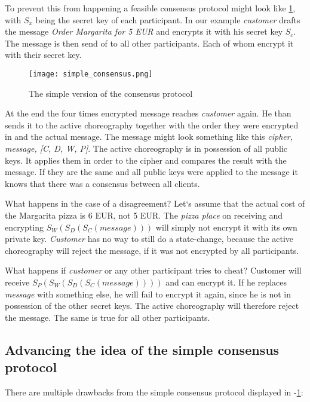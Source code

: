 \documentclass[runningheads]{llncs}
\begin{document}
To prevent this from happening a feasible consensus protocol might look like \ref{fig:simple}, with $S_x$ being the secret key of each participant. In our example \textit{customer} drafts the message \textit{Order Margarita for 5 EUR} and encrypts it with his secret key $S_c$. The message is then send of to all other participants. Each of whom encrypt it with their secret key. 


\begin{figure}
    \centering
    \texttt{[image: simple\_consensus.png]}
    \caption{The simple version of the consensus protocol}
    \label{fig:simple}
\end{figure}


At the end the four times encrypted message reaches \textit{customer} again. He than sends it to the active choreography together with the order they were encrypted in and the actual message. The message might look something like this \textit{cipher, message, [C, D, W, P]}. The active choreography is in possession of all public keys. It applies them in order to the cipher and compares the result with the message. If they are the same and all public keys were applied to the message it knows that there was a consensus between all clients. 

What happens in the case of a disagreement? Let`s assume that the actual cost of the Margarita pizza is 6 EUR, not 5 EUR. The \textit{pizza place} on receiving and encrypting  $S_W(S_D(S_C(message)))$ will simply not encrypt it with its own private key. \textit{Customer} has no way to still do a state-change, because the active choreography will reject the message, if it was not encrypted by all participants. 

What happens if \textit{customer} or any other participant tries to cheat? Customer will receive $S_P(S_W(S_D(S_C(message))))$ and can encrypt it. If he replaces \textit{message} with something else, he will fail to encrypt it again, since he is not in possession of the other secret keys. The active choreography will therefore reject the message. The same is true for all other participants. 


\subsection{Advancing the idea of the simple consensus protocol}

There are multiple drawbacks from the simple consensus protocol displayed in -\ref{fig:simple}: 
\end{document}
